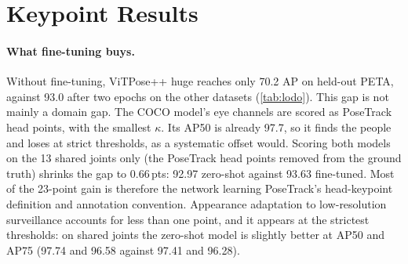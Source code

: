 \documentclass[10pt,twocolumn,letterpaper]{article}
\newcommand{\pts}{\,pts}
\begin{document}
\section{Keypoint Results}
\label{sec:models}

\paragraph{What fine-tuning buys.} Without fine-tuning, ViTPose++ huge reaches only 70.2 AP on held-out PETA, against 93.0 after two epochs on the other datasets (\cref{tab:lodo}). This gap is not mainly a domain gap. The COCO model's eye channels are scored as PoseTrack head points, with the smallest $\kappa$. Its AP50 is already 97.7, so it finds the people and loses at strict thresholds, as a systematic offset would. Scoring both models on the 13 shared joints only (the PoseTrack head points removed from the ground truth) shrinks the gap to 0.66\pts: 92.97 zero-shot against 93.63 fine-tuned. Most of the 23-point gain is therefore the network learning PoseTrack's head-keypoint definition and annotation convention. Appearance adaptation to low-resolution surveillance accounts for less than one point, and it appears at the strictest thresholds: on shared joints the zero-shot model is slightly better at AP50 and AP75 (97.74 and 96.58 against 97.41 and 96.28).

\begin{table}[t]
\centering\small
\setlength{\tabcolsep}{3.2pt}
\caption{OKS AP ($\times100$) on held-out datasets, two epochs of fine-tuning on the other two. ``Shared joints'' removes the PoseTrack head points from the ground truth; it was measured on PETA only.}
\label{tab:lodo}
\end{table}
\end{document}
